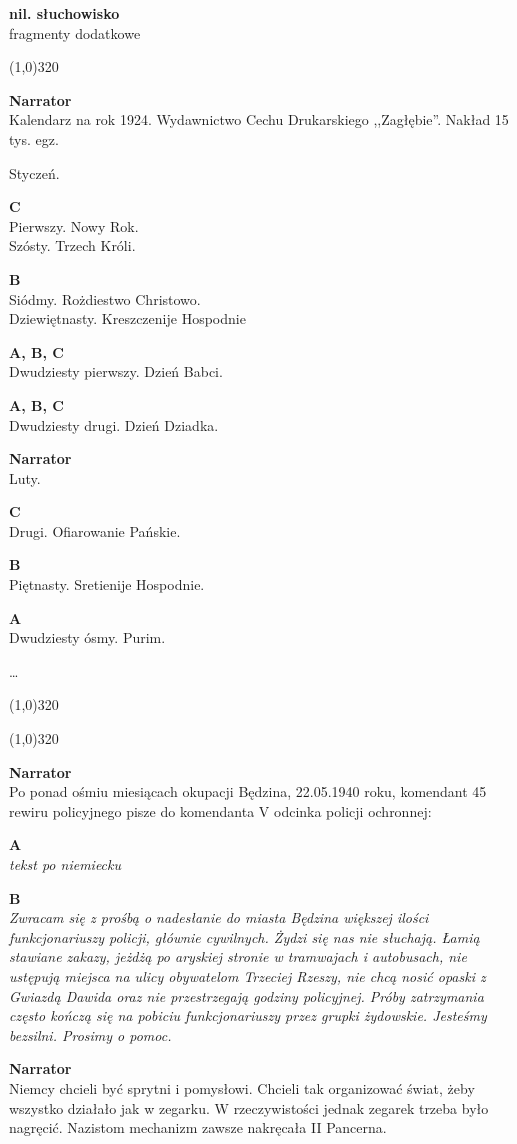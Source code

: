 \documentclass[11pt,a4paper,oneside]{article}
\begin{document}
\noindent
\textbf{nil. słuchowisko}\\
fragmenty dodatkowe
 
\line(1,0){320}

\textbf{Narrator}\\
Kalendarz na rok 1924. Wydawnictwo Cechu Drukarskiego
,,Zagłębie''. Nakład 15 tys. egz.

Styczeń.

\textbf{C}\\
Pierwszy. Nowy Rok. \\
Szósty. Trzech Króli.

\textbf{B}\\
Siódmy. Rożdiestwo Christowo. \\
Dziewiętnasty. Kreszczenije Hospodnie

\textbf{A, B, C}\\
Dwudziesty pierwszy. Dzień Babci.

\textbf{A, B, C}\\
Dwudziesty drugi. Dzień Dziadka.

\textbf{Narrator}\\
Luty.

\textbf{C}\\
Drugi. Ofiarowanie Pańskie.

\textbf{B}\\
Piętnasty. Sretienije Hospodnie.

\textbf{A}\\
Dwudziesty ósmy. Purim.

\dots{}

\line(1,0){320}

\newpage
\line(1,0){320}

\textbf{Narrator}\\
Po ponad ośmiu miesiącach okupacji Będzina, 22.05.1940 roku, komendant 45
rewiru policyjnego pisze do komendanta V odcinka policji ochronnej:


\textbf{A}\\
\emph{tekst po niemiecku}


\textbf{B}\\
\emph{Zwracam się z prośbą o nadesłanie do miasta Będzina większej ilości
funkcjonariuszy policji, głównie cywilnych. Żydzi się nas nie słuchają. Łamią
stawiane zakazy, jeżdżą po aryskiej stronie w tramwajach i autobusach, nie
ustępują miejsca na ulicy obywatelom Trzeciej Rzeszy, nie chcą nosić opaski
z Gwiazdą Dawida oraz nie przestrzegają godziny policyjnej. Próby zatrzymania
często kończą się na pobiciu funkcjonariuszy przez grupki żydowskie. Jesteśmy 
bezsilni. Prosimy o pomoc.}


\textbf{Narrator}\\
Niemcy chcieli być sprytni i pomysłowi. Chcieli tak organizować świat, 
żeby wszystko działało jak w zegarku. W rzeczywistości jednak zegarek
trzeba było nagręcić. Nazistom mechanizm zawsze nakręcała II Pancerna. 
\end{document}
